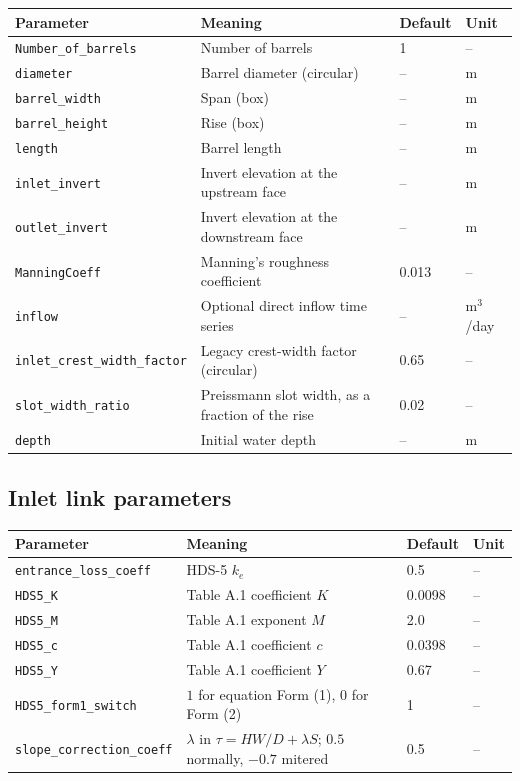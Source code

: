 \documentclass[11pt,a4paper]{article}
\newcommand{\code}[1]{\texttt{\small #1}}
\begin{document}
\begin{longtable}{@{}p{}p{}p{}p{}@{}}
\toprule
\textbf{Parameter} & \textbf{Meaning} & \textbf{Default} & \textbf{Unit}\\
\midrule
\endhead
\code{Number\_of\_barrels} & Number of barrels & 1 & -- \\
\code{diameter} & Barrel diameter (circular) & -- & m \\
\code{barrel\_width} & Span (box) & -- & m \\
\code{barrel\_height} & Rise (box) & -- & m \\
\code{length} & Barrel length & -- & m \\
\code{inlet\_invert} & Invert elevation at the upstream face & -- & m \\
\code{outlet\_invert} & Invert elevation at the downstream face & -- & m \\
\code{ManningCoeff} & Manning's roughness coefficient & 0.013 & -- \\
\code{inflow} & Optional direct inflow time series & -- & m$^3$/day \\
\code{inlet\_crest\_width\_factor} & Legacy crest-width factor (circular) & 0.65 & -- \\
\code{slot\_width\_ratio} & Preissmann slot width, as a fraction of the rise & 0.02 & -- \\
\code{depth} & Initial water depth & -- & m \\
\bottomrule
\end{longtable}

\subsection{Inlet link parameters}

\begin{longtable}{@{}p{}p{}p{}p{}@{}}
\toprule
\textbf{Parameter} & \textbf{Meaning} & \textbf{Default} & \textbf{Unit}\\
\midrule
\endhead
\code{entrance\_loss\_coeff} & HDS-5 $k_e$ & 0.5 & -- \\
\code{HDS5\_K} & Table A.1 coefficient $K$ & 0.0098 & -- \\
\code{HDS5\_M} & Table A.1 exponent $M$ & 2.0 & -- \\
\code{HDS5\_c} & Table A.1 coefficient $c$ & 0.0398 & -- \\
\code{HDS5\_Y} & Table A.1 coefficient $Y$ & 0.67 & -- \\
\code{HDS5\_form1\_switch} & $1$ for equation Form (1), $0$ for Form (2) & 1 & -- \\
\code{slope\_correction\_coeff} & $\lambda$ in $\tau=HW/D+\lambda S$; $0.5$ normally, $-0.7$ mitered & 0.5 & -- \\
\bottomrule
\end{longtable}
\end{document}
